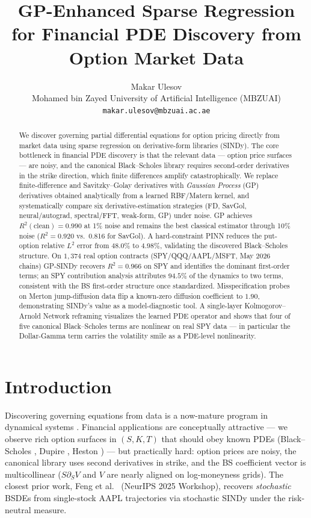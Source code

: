 \documentclass[10pt]{article}
\title{\textbf{GP-Enhanced Sparse Regression for Financial PDE Discovery from Option Market Data}}
\author{Makar Ulesov\\\small Mohamed bin Zayed University of Artificial Intelligence (MBZUAI)\\\small \texttt{makar.ulesov@mbzuai.ac.ae}}
\date{}
\begin{document}
\maketitle

\begin{abstract}
\noindent
We discover governing partial differential equations for option pricing directly from market data using sparse regression on derivative-form libraries (SINDy). The core bottleneck in financial PDE discovery is that the relevant data --- option price surfaces --- are noisy, and the canonical Black--Scholes library requires second-order derivatives in the strike direction, which finite differences amplify catastrophically. We replace finite-difference and Savitzky--Golay derivatives with \emph{Gaussian Process} (GP) derivatives obtained analytically from a learned RBF/Matern kernel, and systematically compare six derivative-estimation strategies (FD, SavGol, neural/autograd, spectral/FFT, weak-form, GP) under noise. GP achieves $R^2(\text{clean})=0.990$ at 1\% noise and remains the best classical estimator through 10\% noise ($R^2=0.920$ vs.\ 0.816 for SavGol). A hard-constraint PINN reduces the put-option relative $L^2$ error from $48.0\%$ to $4.98\%$, validating the discovered Black--Scholes structure. On $1{,}374$ real option contracts (SPY/QQQ/AAPL/MSFT, May 2026 chains) GP-SINDy recovers $R^2=0.966$ on SPY and identifies the dominant first-order terms; an SPY contribution analysis attributes $94.5\%$ of the dynamics to two terms, consistent with the BS first-order structure once standardized. Misspecification probes on Merton jump-diffusion data flip a known-zero diffusion coefficient to $1.90$, demonstrating SINDy's value as a model-diagnostic tool. A single-layer Kolmogorov--Arnold Network reframing visualizes the learned PDE operator and shows that four of five canonical Black--Scholes terms are nonlinear on real SPY data --- in particular the Dollar-Gamma term carries the volatility smile as a PDE-level nonlinearity.
\end{abstract}

\section{Introduction}\label{sec:intro}

Discovering governing equations from data is a now-mature program in dynamical systems \citep{brunton2016sindy,rudy2017pde,schaeffer2017learning}. Financial applications are conceptually attractive --- we observe rich option surfaces in $(S,K,T)$ that should obey known PDEs (Black--Scholes \citep{blackscholes1973}, Dupire \citep{dupire1994pricing}, Heston \citep{heston1993closed}) --- but practically hard: option prices are noisy, the canonical library uses second derivatives in strike, and the BS coefficient vector is multicollinear ($S\partial_S V$ and $V$ are nearly aligned on log-moneyness grids). The closest prior work, Feng et al.\ \citep{feng2025feynmankac} (NeurIPS 2025 Workshop), recovers \emph{stochastic} BSDEs from single-stock AAPL trajectories via stochastic SINDy under the risk-neutral measure.
\end{document}
